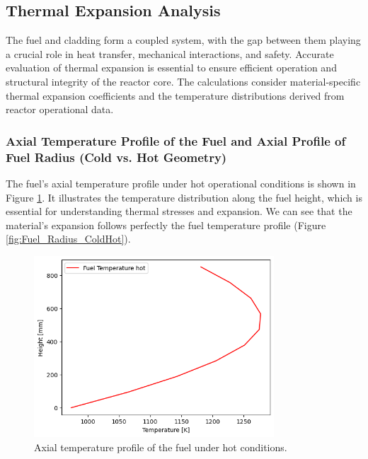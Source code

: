 \subsection{Thermal Expansion Analysis}

The fuel and cladding form a coupled system, with the gap between them playing a crucial role in heat transfer, mechanical interactions, and safety. Accurate evaluation of thermal expansion is essential to ensure efficient operation and structural integrity of the reactor core. The calculations consider material-specific thermal expansion coefficients and the temperature distributions derived from reactor operational data.

\subsubsection{Axial Temperature Profile of the Fuel and Axial Profile of Fuel Radius (Cold vs. Hot Geometry)}

The fuel's axial temperature profile under hot operational conditions is shown in Figure \ref{fig:Fuel_Temperature_Hot}. It illustrates the temperature distribution along the fuel height, which is essential for understanding thermal stresses and expansion. We can see that the material’s expansion follows perfectly the fuel temperature profile (Figure \ref{fig:Fuel_Radius_ColdHot}).

\begin{figure}[H]
\centering
\includegraphics[width=0.8\textwidth]{1a_fuel_hot.png}
\caption{Axial temperature profile of the fuel under hot conditions.}
\label{fig:Fuel_Temperature_Hot}
\end{figure}

